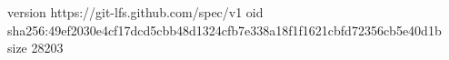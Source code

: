 version https://git-lfs.github.com/spec/v1
oid sha256:49ef2030e4cf17dcd5cbb48d1324cfb7e338a18f1f1621cbfd72356cb5e40d1b
size 28203
